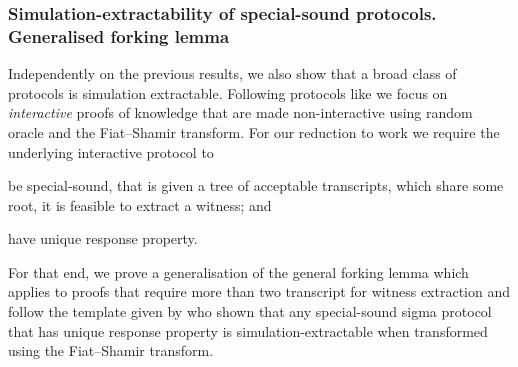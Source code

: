 \documentclass[runningheads,10pt]{llncs}
\begin{document}
	
	\subsubsection*{Simulation-extractability of special-sound protocols. Generalised forking lemma}
	Independently on the previous results, we also show that a broad class of protocols is simulation extractable. 
	Following protocols like \cite{EPRINT:GabWilCio19,CCS:MBKM19,EC:CHMMVW20} we focus on \emph{interactive} proofs of knowledge that are made non-interactive using random oracle and the Fiat--Shamir transform. For our reduction to work we require the underlying interactive protocol to 
	\begin{compactenum}
		\item be special-sound, that is given a tree of acceptable transcripts, which share some root, it is feasible to extract a witness; and
		\item have unique response property.
	\end{compactenum}
	For that end, we prove a generalisation of the general forking lemma which applies to proofs that require more than two transcript for witness extraction and follow the template given by \cite{INDOCRYPT:FKMV12} who shown that any special-sound sigma protocol that has unique response property is simulation-extractable when transformed using the Fiat--Shamir transform.
	
	\clearpage
	
	
\end{document}
